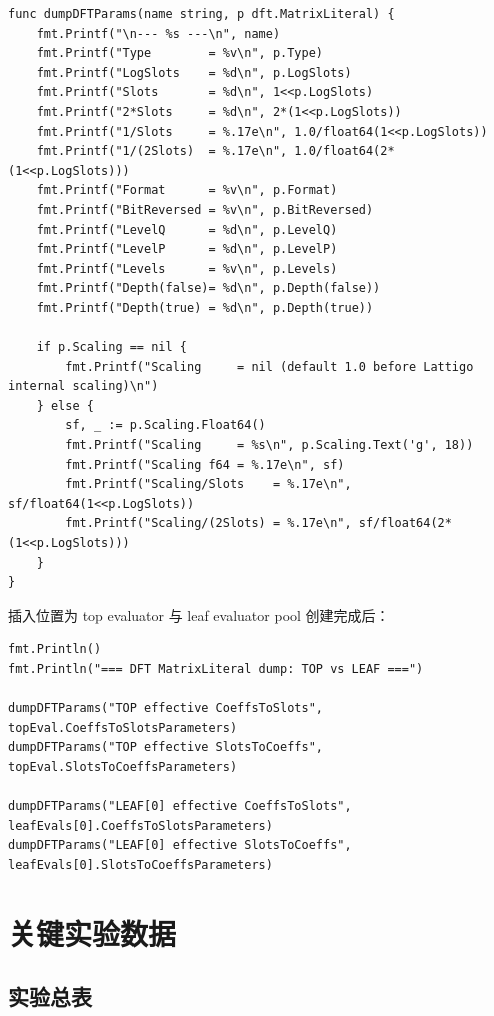 \documentclass[UTF8,a4paper,11pt]{ctexart}
\begin{document}
\begin{lstlisting}[style=gostyle,caption={DFT MatrixLiteral dump 函数}]
func dumpDFTParams(name string, p dft.MatrixLiteral) {
    fmt.Printf("\n--- %s ---\n", name)
    fmt.Printf("Type        = %v\n", p.Type)
    fmt.Printf("LogSlots    = %d\n", p.LogSlots)
    fmt.Printf("Slots       = %d\n", 1<<p.LogSlots)
    fmt.Printf("2*Slots     = %d\n", 2*(1<<p.LogSlots))
    fmt.Printf("1/Slots     = %.17e\n", 1.0/float64(1<<p.LogSlots))
    fmt.Printf("1/(2Slots)  = %.17e\n", 1.0/float64(2*(1<<p.LogSlots)))
    fmt.Printf("Format      = %v\n", p.Format)
    fmt.Printf("BitReversed = %v\n", p.BitReversed)
    fmt.Printf("LevelQ      = %d\n", p.LevelQ)
    fmt.Printf("LevelP      = %d\n", p.LevelP)
    fmt.Printf("Levels      = %v\n", p.Levels)
    fmt.Printf("Depth(false)= %d\n", p.Depth(false))
    fmt.Printf("Depth(true) = %d\n", p.Depth(true))

    if p.Scaling == nil {
        fmt.Printf("Scaling     = nil (default 1.0 before Lattigo internal scaling)\n")
    } else {
        sf, _ := p.Scaling.Float64()
        fmt.Printf("Scaling     = %s\n", p.Scaling.Text('g', 18))
        fmt.Printf("Scaling f64 = %.17e\n", sf)
        fmt.Printf("Scaling/Slots    = %.17e\n", sf/float64(1<<p.LogSlots))
        fmt.Printf("Scaling/(2Slots) = %.17e\n", sf/float64(2*(1<<p.LogSlots)))
    }
}
\end{lstlisting}

插入位置为 top evaluator 与 leaf evaluator pool 创建完成后：

\begin{lstlisting}[style=gostyle,caption={在 main 中打印 top/leaf DFT 参数}]
fmt.Println()
fmt.Println("=== DFT MatrixLiteral dump: TOP vs LEAF ===")

dumpDFTParams("TOP effective CoeffsToSlots", topEval.CoeffsToSlotsParameters)
dumpDFTParams("TOP effective SlotsToCoeffs", topEval.SlotsToCoeffsParameters)

dumpDFTParams("LEAF[0] effective CoeffsToSlots", leafEvals[0].CoeffsToSlotsParameters)
dumpDFTParams("LEAF[0] effective SlotsToCoeffs", leafEvals[0].SlotsToCoeffsParameters)
\end{lstlisting}

\section{关键实验数据}

\subsection{实验总表}
\end{document}
